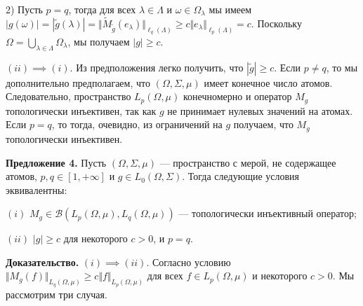 \documentclass[11pt,twoside]{article}
\begin{document}
2) Пусть $p=q$, тогда для всех $\lambda\in\Lambda$ и $\omega\in\Omega_\lambda$ мы имеем $|g(\omega)|=|\widetilde{g}(\lambda)|
=\Vert \widetilde{M}_{\widetilde{g}}(e_\lambda)\Vert_{\ell_q(\Lambda)}
\geq c\Vert e_\lambda\Vert_{\ell_p(\Lambda)}
=c$. Поскольку $\Omega=\bigcup_{\lambda\in\Lambda}\Omega_\lambda$, мы получаем $|g|\geq c$.

$(ii)$$\implies$$ (i)$. Из предположения легко получить, что $|\widetilde{g}|\geq c$. Если $p\neq q$, то мы дополнительно предполагаем, что $(\Omega,\Sigma,\mu)$ имеет конечное число атомов. Следовательно, пространство $L_p(\Omega,\mu)$ конечномерно и оператор $M_g$ топологически инъективен, так как $g$ не принимает нулевых значений на атомах. Если $p=q$, то тогда, очевидно, из ограничений на $g$ получаем, что $M_{g}$ топологически инъективен.


\textbf{Предложение 4.} Пусть $(\Omega,\Sigma,\mu)$ --- пространство с мерой, не содержащее атомов, $p,q\in[1,+\infty]$ и $g\in L_0(\Omega,\Sigma)$. Тогда следующие условия эквивалентны:

$(i)$ $M_g\in\mathcal{B}(L_p(\Omega,\mu),L_q(\Omega,\mu))$ --- топологически инъективный оператор;

$(ii)$ $|g|\geq c$ для некоторого $c>0$, и $p=q$.


\textbf{Доказательство.} $(i)$$\implies$$ (ii)$. Согласно условию $\Vert M_g(f)\Vert_{L_q(\Omega,\mu)}\geq c\Vert f\Vert_{L_p(\Omega,\mu)}$ для всех $f\in L_p(\Omega,\mu)$ и некоторого $c>0$. Мы рассмотрим три случая. 
\end{document}
